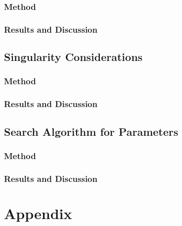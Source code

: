 \documentclass[a4paper, oneside, 12pt]{article}
\begin{document}
\subsubsection{Method}
\subsubsection{Results and Discussion}

\newpage
\subsection{Singularity Considerations}
\subsubsection{Method}
\subsubsection{Results and Discussion}

\newpage
\subsection{Search Algorithm for Parameters}
\subsubsection{Method}
\subsubsection{Results and Discussion}

\newpage
\section*{Appendix}

\begin{lstlisting}[language=MATLAB]
\end{lstlisting}

\newpage


\end{document}
